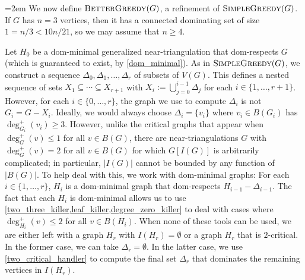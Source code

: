 \documentclass{patmorin}
\begin{document}
\emergencystretch=2em
We now define $\textsc{BetterGreedy}(G)$, a refinement of $\textsc{SimpleGreedy}(G)$.  If $G$ has $n=3$ vertices, then it has a connected dominating set of size $1=n/3<10n/21$, so we may assume that $n\ge 4$.

Let $H_0$ be a dom-minimal generalized near-triangulation that dom-respects $G$ (which is guaranteed to exist, by \cref{dom_minimal}). As in $\textsc{SimpleGreedy}(G)$, we construct a sequence $\Delta_0,\Delta_1,\ldots,\Delta_{r}$ of subsets of $V(G)$. This defines a nested sequence of sets $X_1\subseteq\cdots\subseteq X_{r+1}$ with $X_i:=\bigcup_{j=0}^{i-1}\Delta_j$ for each $i\in\{1,\ldots,r+1\}$.  However, for each $i\in\{0,\ldots,r\}$, the graph we use to compute $\Delta_i$ is not $G_i=G-X_i$.  Ideally, we would always choose $\Delta_i=\{v_i\}$ where $v_i\in B(G_i)$ has $\deg^+_{G_i}(v_i)\ge 3$.  However, unlike the critical graphs that appear when $\deg^+_G(v)\le 1$ for all $v\in B(G)$, there are near-triangulations $G$ with $\deg^+_G(v)=2$ for all $v\in B(G)$ for which $G[I(G)]$ is arbitrarily complicated; in particular, $|I(G)|$ cannot be bounded by any function of $|B(G)|$. To help deal with this, we work with dom-minimal graphs: For each $i\in\{1,\ldots,r\}$, $H_i$ is a dom-minimal graph that dom-respects $H_{i-1}-\Delta_{i-1}$. The fact that each $H_i$ is dom-minimal allows us to use \cref{two_three_killer,leaf_killer,degree_zero_killer} to deal with cases where $\deg^+_{H_i}(v)\le 2$ for all $v\in B(H_i)$. When none of these tools can be used, we are either left with a graph $H_r$ with $I(H_r)=\emptyset$ or a graph $H_r$ that is $2$-critical. In the former case, we can take $\Delta_r=\emptyset$. In the latter case, we use \cref{two_critical_handler} to compute the final set $\Delta_r$ that dominates the remaining vertices in $I(H_r)$.
\end{document}
